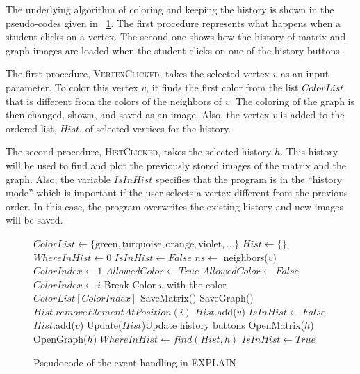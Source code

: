 \documentclass[12pt, twoside]{book}
\begin{document}
The underlying algorithm of coloring and keeping the history is shown in the pseudo-codes given in \figurename~\ref{f:alg}. The first procedure represents what happens when a student clicks on a vertex. The second one shows how the history of matrix and graph images are loaded when the student clicks on one of the history buttons.

The first procedure, \textsc{VertexClicked}, takes the selected vertex $v$ as an input parameter. To color this vertex $v$, it finds the first color from the list $ColorList$ that is different from the colors of the neighbors of $v$. The coloring of the graph is then changed, shown, and saved as an image. Also, the vertex $v$ is added to the ordered list, $Hist$, of selected vertices for the history.

The second procedure, \textsc{HistClicked}, takes the selected history $h$. This history will be used to find and plot the previously stored images of the matrix and the graph. Also, the variable $IsInHist$ specifies that the program is in the ``history mode'' which is important if the user selects a vertex different from the previous order. In this case, the program overwrites the existing history and new images will be saved.

\begin{figure}
\centering
\begin{algorithmic}[1]
\State $ColorList \gets \{\text{green}, \text{turquoise}, \text{orange}, \text{violet}, ...\}$
\State $Hist \gets \{\}$
\State $WhereInHist \gets 0$
\State $IsInHist \gets False$
\State
{}
\State $ns\gets$ neighbors($v$)
\State $ColorIndex \gets 1$
\State $AllowedColor \gets True$
\State $AllowedColor \gets False$
\EndIf
\EndFor
{}
\State $ColorIndex \gets i$
\State Break
\EndIf
\EndFor
\State Color $v$ with the color $ColorList[ColorIndex]$
\State
{}
\State SaveMatrix()
\State SaveGraph()
\EndIf
{}
\State $Hist.removeElementAtPosition(i)$
\EndFor
\State $Hist$.add($v$)
\State $IsInHist \gets False$
\Else
\State $Hist$.add($v$)
\EndIf
\State Update($Hist$)\Comment Update history buttons
\EndProcedure
\State
\State
{}
\State OpenMatrix($h$)
\State OpenGraph($h$)
\State $WhereInHist \gets find(Hist,h)$
\State $IsInHist \gets True$
\EndProcedure
\end{algorithmic}
\caption{Pseudocode of the event handling in EXPLAIN}
\label{f:alg}
\end{figure}
\end{document}
